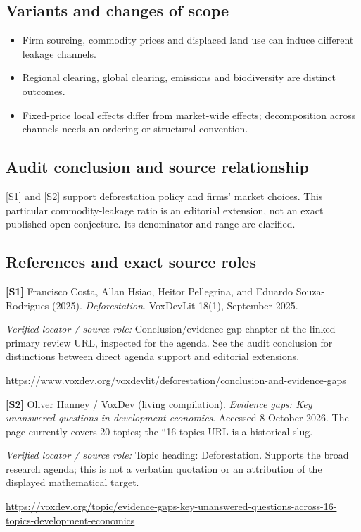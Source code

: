 \documentclass[11pt,a4paper]{article}
\begin{document}
\subsection*{Variants and changes of scope}

\begin{itemize}
\item Firm sourcing, commodity prices and displaced land use can induce different leakage channels.
\item Regional clearing, global clearing, emissions and biodiversity are distinct outcomes.
\item Fixed-price local effects differ from market-wide effects; decomposition across channels needs an ordering or structural convention.
\end{itemize}

\subsection*{Audit conclusion and source relationship}

[S1] and [S2] support deforestation policy and firms' market choices. This particular commodity-leakage ratio is an editorial extension, not an exact published open conjecture. Its denominator and range are clarified.

\subsection*{References and exact source roles}

{\footnotesize\raggedright
\par\noindent\textbf{[S1]} Francisco Costa, Allan Hsiao, Heitor Pellegrina, and Eduardo Souza-Rodrigues (2025). \emph{Deforestation}. VoxDevLit 18(1), September 2025.\par \textit{Verified locator / source role:} Conclusion/evidence-gap chapter at the linked primary review URL, inspected for the agenda. See the audit conclusion for distinctions between direct agenda support and editorial extensions.\par \url{https://www.voxdev.org/voxdevlit/deforestation/conclusion-and-evidence-gaps}\par\smallskip
\par\noindent\textbf{[S2]} Oliver Hanney / VoxDev (living compilation). \emph{Evidence gaps: Key unanswered questions in development economics}. Accessed 8 October 2026. The page currently covers 20 topics; the ``16-topics URL is a historical slug.\par \textit{Verified locator / source role:} Topic heading: Deforestation. Supports the broad research agenda; this is not a verbatim quotation or an attribution of the displayed mathematical target.\par \url{https://voxdev.org/topic/evidence-gaps-key-unanswered-questions-across-16-topics-development-economics}\par\smallskip
}
\end{document}
